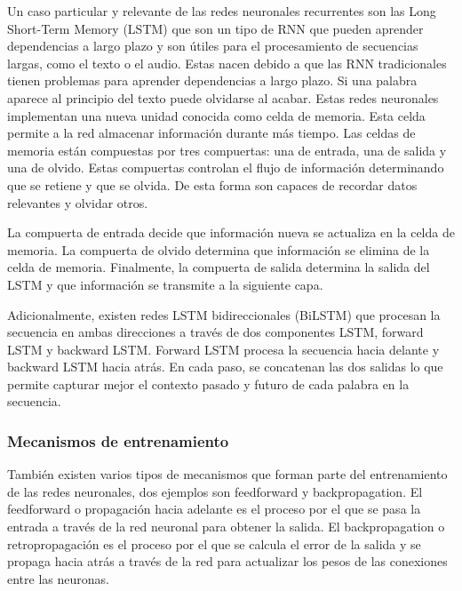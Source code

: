 Un caso particular y relevante de las redes neuronales recurrentes son las Long Short-Term Memory (LSTM) que son un tipo de RNN que pueden aprender dependencias a largo plazo y son útiles para el procesamiento de secuencias largas, como el texto o el audio.
Estas nacen debido a que las RNN tradicionales tienen problemas para aprender dependencias a largo plazo. Si una palabra aparece al principio del texto puede olvidarse al acabar.
Estas redes neuronales implementan una nueva unidad conocida como celda de memoria. Esta celda permite a la red almacenar información durante más tiempo. 
Las celdas de memoria están compuestas por tres compuertas: una de entrada, una de salida y una de olvido. \cite{mathworks:lstm}
Estas compuertas controlan el flujo de información determinando que se retiene y que se olvida. De esta forma son capaces de recordar datos relevantes y olvidar otros.

La compuerta de entrada decide que información nueva se actualiza en la celda de memoria. 
La compuerta de olvido determina que información se elimina de la celda de memoria.
Finalmente, la compuerta de salida determina la salida del LSTM y que información se transmite a la siguiente capa.


Adicionalmente, existen redes LSTM bidireccionales (BiLSTM) que procesan la secuencia en ambas direcciones a través de dos componentes LSTM, forward LSTM y backward LSTM. 
Forward LSTM procesa la secuencia hacia delante y backward LSTM hacia atrás. En cada paso, se concatenan las dos salidas lo que permite capturar mejor el contexto pasado y futuro de cada palabra en la secuencia. \cite{mathworks:lstm}


\subsubsection{Mecanismos de entrenamiento}

También existen varios tipos de mecanismos que forman parte del entrenamiento de las redes neuronales, dos ejemplos son feedforward y backpropagation.
El feedforward o propagación hacia adelante es el proceso por el que se pasa la entrada a través de la red neuronal para obtener la salida.
El backpropagation o retropropagación es el proceso por el que se calcula el error de la salida y se propaga hacia atrás a través de la red para actualizar los pesos de las conexiones entre las neuronas.


